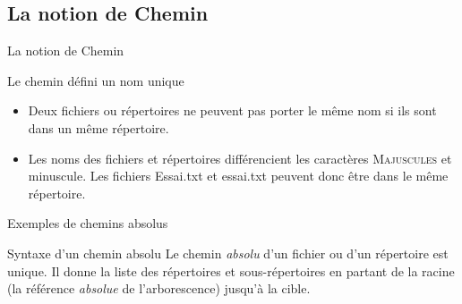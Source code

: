 \subsection{La notion de Chemin}
\begin{frame}{La notion de Chemin}
  \begin{block}{Le chemin défini un nom unique}
    \begin{itemize}
    \item Deux fichiers ou répertoires ne peuvent pas porter le même nom si ils sont dans un même répertoire.
    \item Les noms des fichiers et répertoires différencient les caractères \textsc{Majuscules} et minuscule. Les fichiers \alert{E}ssai.txt et \alert{e}ssai.txt peuvent donc être dans le même répertoire. 
    \end{itemize}
  \end{block}
  \begin{block}{Exemples de chemins absolus}
  \end{block}
  \begin{alertblock}{Syntaxe d'un chemin absolu}
    Le chemin \textit{absolu} d'un fichier ou d'un répertoire est unique. Il donne la liste des répertoires et sous-répertoires en partant de la racine \lin{/} (la référence \textit{absolue} de l'arborescence) jusqu'à la cible.
  \end{alertblock}
\end{frame}

